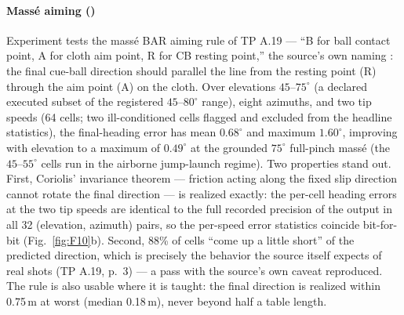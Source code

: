 \paragraph{Mass\'e aiming ()}
Experiment  tests the mass\'e BAR aiming rule of
TP A.19 \citep{alciatore_tp_catalog} --- ``B for ball contact point, A
for cloth aim point, R for CB resting point,'' the source's own naming
\citep{alciatore_faq}: the final cue-ball direction should
parallel the line from the resting point (R) through the aim point (A)
on the cloth. Over elevations $45$--$75^\circ$ (a declared executed subset of
the registered $45$--$80^\circ$ range), eight azimuths, and two tip
speeds (64 cells; two ill-conditioned cells flagged and excluded from the
headline statistics), the final-heading error has mean $0.68^\circ$ and
maximum $1.60^\circ$, improving with elevation to a maximum of
$0.49^\circ$ at the grounded $75^\circ$ full-pinch mass\'e (the
$45$--$55^\circ$ cells run in the airborne jump-launch regime). Two
properties stand out. First, Coriolis' invariance theorem --- friction
acting along the fixed slip direction cannot rotate the final direction
\citep{coriolis1835} --- is realized exactly: the per-cell heading errors
at the two tip speeds are identical to the full recorded precision of the
output in all 32 (elevation, azimuth) pairs, so the per-speed error
statistics coincide bit-for-bit (Fig.~\ref{fig:F10}b). Second, 88\% of
cells ``come up a little short'' of the predicted direction, which is
precisely the behavior the source itself expects of real shots (TP A.19,
p.~3) --- a pass with the source's own caveat reproduced. The rule is also
usable where it is taught: the final direction is realized within 0.75\,m
at worst (median 0.18\,m), never beyond half a table length.

